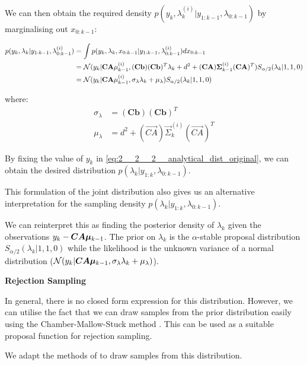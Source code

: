 \documentclass[../main.tex]{subfiles}
\begin{document}
We can then obtain the required density $p(y_k, \lambda_k^{(i)} | y_{1:k-1}, \lambda_{0:k-1})$ by marginalising out $x_{0:k-1}$: 

\begin{align}
p(y_k, \lambda_k | y_{1:k-1}, \lambda_{0:k-1}^{(i)}) &= \int p(y_k, \lambda_k, x_{0:k-1} | y_{1:k-1}, \lambda_{0:k-1}^{(i)}) d x_{0:k-1}\notag \\
&=  \mathcal{N}(y_k | \mathbf{CA} \mu_{k-1}^{(i)} , (\mathbf{Cb})(\mathbf{Cb})^T\lambda_k + d^2 + (\vec{CA})\vec{\Sigma}_{k-1}^{(i)}(\vec{CA})^T) S_{\alpha/2} (\lambda_k | 1,1,0) \notag \\
&= \mathcal{N}(y_k | \mathbf{CA} \mu_{k-1}^{(i)} , \sigma_\lambda \lambda_k + \mu_\lambda) S_{\alpha/2} (\lambda_k | 1,1,0)
\label{eq:2__2__2__analytical_dist_original}
\end{align}

where: 
\begin{align*}
\sigma_\lambda &= (\mathbf{Cb})(\mathbf{Cb})^T \\
\mu_\lambda &= d^2 + (\vec{CA})\vec{\Sigma}_k^{(i)}(\vec{CA})^T
\end{align*}



By fixing the value of $y_k$ in \autoref{eq:2__2__2__analytical_dist_original}, we can obtain the desired distribution $p(\lambda_k | y_{1:k}, \lambda_{0:k-1})$. 

This formulation of the joint distribution also gives us an alternative interpretation for the sampling density $p(\lambda_k | y_{1:k}, \lambda_{0:k-1})$. 

We can reinterpret this as finding the posterior density of $\lambda_k$ given the observations $y_k - \bm{CA\mu}_{k-1}$. The prior on $\lambda_k$ is the $\alpha$-stable proposal distribution $S_{\alpha/2} (\lambda_k | 1,1,0)$ while the likelihood is the unknown variance of a normal distribution ($\mathcal{N}(y_k | \bm{CA\mu}_{k-1} , \sigma_\lambda \lambda_k + \mu_\lambda)$).

\textbf{Rejection Sampling}

In general, there is no closed form expression for this distribution. However, we can utilise the fact that we can draw samples from the prior distribution easily using the Chamber-Mallow-Stuck method \cite{chambers1976method}. This can be used as a suitable proposal function for rejection sampling. 

We adapt the methods of \cite{godsill1999bayesian} to draw samples from this distribution.
\end{document}
